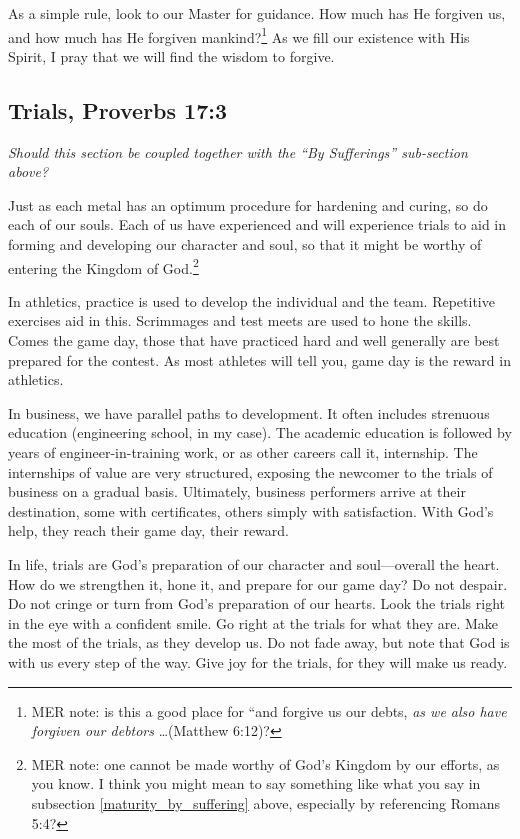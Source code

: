 \documentclass[12pt]{memoir}
\begin{document}
As a simple rule, look to our Master for guidance. How much has He
forgiven us, and how much has He forgiven mankind?\footnote{MER note: is this a good place for ``and forgive us our debts, \emph{as we also have forgiven our debtors} \dots (Matthew 6:12)?} As we fill our
existence with His Spirit, I pray that we will find the wisdom to
forgive.

\subsection[Trials]{Trials, Proverbs 17:3}
  

\begin{center}
\emph{Should this section be coupled together with the ``By Sufferings'' sub-section above?}
\end{center}

Just as each metal has an optimum procedure for hardening and curing, so do each of our souls. Each of us have experienced and will experience trials to aid in forming and developing our character and soul, so that it might be worthy of entering the Kingdom of God.\footnote{MER note: one cannot be made worthy of God's Kingdom by our efforts, as you know. I think you might mean to say something like what you say in subsection \ref{maturity_by_suffering} above, especially by referencing Romans 5:4?}

In athletics, practice is used to develop the individual and the team.
Repetitive exercises aid in this. Scrimmages and test meets are used
to hone the skills. Comes the game day, those that have practiced hard
and well generally are best prepared for the contest. As most athletes
will tell you, game day is the reward in athletics. 

In business, we have parallel paths to development. It often includes
strenuous education (engineering school, in my case). The academic
education is followed by years of engineer-in-training work,
or as other careers call it, internship. The internships of value are very structured, exposing the newcomer to the trials of
business on a gradual basis. Ultimately, business performers arrive at their destination, some with certificates, others simply with satisfaction.
With God's help, they reach their game day, their reward. 

In life, trials are God's preparation of our character and soul---overall
the heart. How do we strengthen it, hone it, and prepare for
our game day? Do not despair. Do not cringe or turn from God's preparation
of our hearts. Look the trials right in the eye with a confident smile. Go right at the trials for what they are. Make the most of
the trials, as they develop us. Do not fade away, but note that God
is with us every step of the way. Give joy for the trials, for they
will make us ready.
\end{document}
